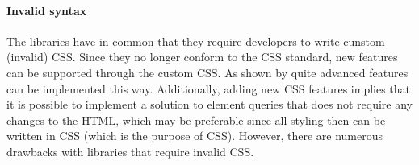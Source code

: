 \documentclass[a4paper,11pt]{kth-mag}
\begin{document}
    
    \paragraph{Invalid syntax}
    The libraries \cite{eq_imp_magichtml,eq_imp_eqcss,eq_imp_prollyfill-min-width,eq_imp_localised-css,eq_imp_gss} have in common that they require developers to write cunstom (invalid) \gls{CSS}.
    Since they no longer conform to the \gls{CSS} standard, new features can be supported through the custom \gls{CSS}.
    As shown by \cite{eq_imp_eqcss,eq_imp_gss} quite advanced features can be implemented this way.
    Additionally, adding new \gls{CSS} features implies that it is possible to implement a solution to element queries that does not require any changes to the \gls{HTML}, which may be preferable since all styling then can be written in \gls{CSS} (which is the purpose of \gls{CSS}).
    However, there are numerous drawbacks with libraries that require invalid \gls{CSS}.
    
\end{document}
